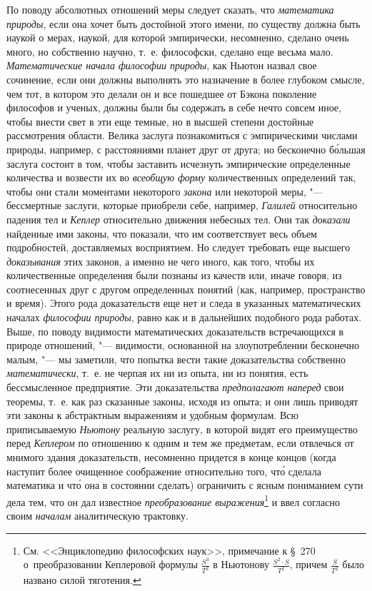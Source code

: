 По поводу абсолютных отношений меры следует сказать, что
{\em математика природы}, если она хочет быть достойной этого имени, по
существу должна быть наукой о мерах, наукой, для которой эмпирически,
несомненно, сделано очень много, но собственно научно, т.~е. философски,
сделано еще весьма мало. {\em Математические начала философии природы}, как
Ньютон назвал свое сочинение, если они должны выполнять это назначение в более
глубоком смысле, чем тот, в котором это делали он и все пошедшее от Бэкона
поколение философов и ученых, должны были бы содержать в себе нечто совсем
иное, чтобы внести свет в эти еще темные, но в высшей степени достойные
рассмотрения области. Велика заслуга познакомиться с эмпирическими числами
природы, например, с расстояниями планет друг от друга; но бесконечно
б\'{о}льшая заслуга состоит в том, чтобы заставить исчезнуть эмпирические
определенные количества и возвести их во {\em всеобщую форму} количественных
определений так, чтобы они стали моментами некоторого {\em закона} или
некоторой меры, "--- бессмертные заслуги, которые приобрели себе, например,
{\em Галилей} относительно падения тел и {\em Кеплер} относительно движения
небесных тел. Они так {\em доказали} найденные ими законы, что показали, что им
соответствует весь объем подробностей, доставляемых восприятием. Но следует
требовать еще высшего {\em доказывания} этих законов, а именно не чего иного,
как того, чтобы их количественные определения были познаны из качеств или,
иначе говоря, из соотнесенных друг с другом определенных понятий (как,
например, пространство и время). Этого рода доказательств еще нет и следа в
указанных математических началах {\em философии природы}, равно как и в
дальнейших подобного рода работах. Выше, по поводу видимости математических
доказательств встречающихся в природе отношений, "--- видимости, основанной на
злоупотреблении бесконечно малым, "--- мы заметили, что попытка вести такие
доказательства собственно {\em математически}, т.~е. не черпая их ни из опыта,
ни из понятия, есть бессмысленное предприятие. Эти доказательства
{\em предполагают наперед} свои теоремы, т.~е. как раз сказанные законы, исходя
из опыта; и они лишь приводят эти законы к абстрактным выражениям и удобным
формулам. Всю приписываемую {\em Ньютону} реальную заслугу, в которой видят его
преимущество перед {\em Кеплером} по отношению к одним и тем же предметам, если
отвлечься от мнимого здания доказательств, несомненно придется в конце концов
(когда наступит более очищенное соображение относительно того, чт\'{о} сделала
математика и чт\'{о} она в состоянии сделать) ограничить с ясным пониманием
сути дела тем, что он дал известное {\em преобразование выражения}\footnote{См.
<<Энциклопедию философских наук>>, примечание к \S~270 о~преобразовании
Кеплеровой формулы $\frac{S^3}{T^2}$ в Ньютонову $\frac{S^2\cdot S}{T^2}$,
причем $\frac{S}{T^2}$ было названо силой тяготения.} и ввел согласно своим
{\em началам} аналитическую трактовку.


